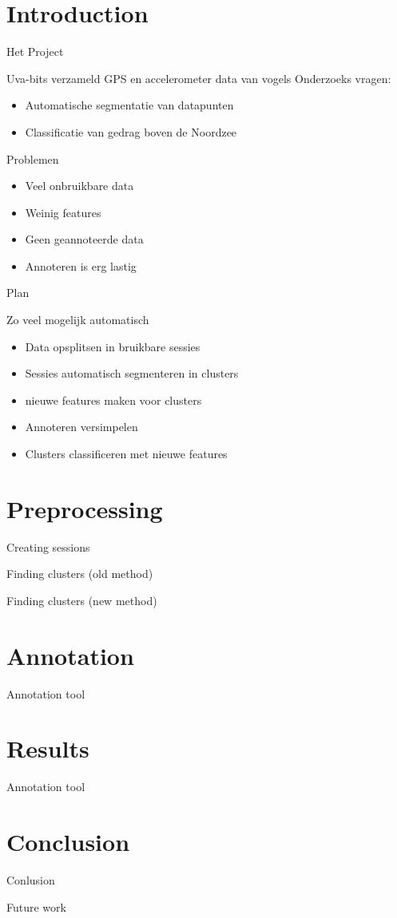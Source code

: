 \documentclass{beamer}
\title{\projectName}
\subtitle{\projectAbbreviation}
\author{Jesse Eisses, Sosha Happel, Maarten Inja and Maarten de Waard}
\institute{UvA}
\newcommand{\slide}[2]
{
\begin{frame}
\begin{block}{#1} 

#2

\end{block} \end{frame}
}
\begin{document}
\begin{frame}
\titlepage
\end{frame}



\section{Introduction}
\slide{Het Project}
{
Uva-bits verzameld GPS en accelerometer data van vogels
Onderzoeks vragen:
\begin{itemize}
	\item Automatische segmentatie van datapunten
	\item Classificatie van gedrag boven de Noordzee
\end{itemize} 
}

\slide{Problemen}
{
\begin{itemize}
	\item Veel onbruikbare data
	\item Weinig features
	\item Geen geannoteerde data
	\item Annoteren is erg lastig
\end{itemize} 
}

\slide{Plan}
{
Zo veel mogelijk automatisch
\begin{itemize}
	\item Data opsplitsen in bruikbare sessies
	\item Sessies automatisch segmenteren in clusters
	\item nieuwe features maken voor clusters
	\item Annoteren versimpelen
	\item Clusters classificeren met nieuwe features
\end{itemize} 
}

\section{Preprocessing}
\slide{Creating sessions}
{
    
}

\slide{Finding clusters (old method)}
{
    
}

\slide{Finding clusters (new method)}
{
    
}



\section{Annotation}
\slide{Annotation tool}
{
	
}

\section{Results}
\slide{Annotation tool}
{
	
}

\section{Conclusion}

\slide{Conlusion}
{
	
}

\slide{Future work}
{
	
}
\end{document}
